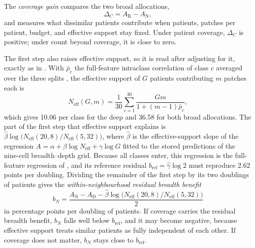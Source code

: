 \documentclass[11pt]{article}
\newcommand{\Neff}{N_{\mathrm{eff}}}
\begin{document}
The \emph{coverage gain} compares the two broad allocations,
\begin{equation}
 \Delta_C=A_{\mathrm R}-A_{\mathrm N},
 \label{eq:coverage-gain}
\end{equation}
\noindent and measures what dissimilar patients contribute when patients, patches per patient, budget, and effective support stay fixed. Under patient coverage, $\Delta_C$ is positive; under count beyond coverage, it is close to zero.

The first step also raises effective support, so it is read after adjusting for it, exactly as in \citet{queisler2026siteCoverage}. With $\bar\rho_c$ the full-feature intraclass correlation of class $c$ averaged over the three splits \citep{queisler2026multidirectionalRedundancy}, the effective support of $G$ patients contributing $m$ patches each is
\begin{equation}
 \Neff(G,m)=\frac{1}{30}\sum_{c=1}^{30}\frac{Gm}{1+(m-1)\bar\rho_c},
 \label{eq:neff}
\end{equation}
\noindent which gives 10.06 per class for the deep and 36.58 for both broad allocations. The part of the first step that effective support explains is $\hat\beta\log\bigl(\Neff(20,8)/\Neff(5,32)\bigr)$, where $\hat\beta$ is the effective-support slope of the regression $A=\alpha+\beta\log\Neff+\gamma\log G$ fitted to the stored predictions of the nine-cell breadth--depth grid. Because all classes enter, this regression is the full-feature regression of \citet{queisler2026multidirectionalRedundancy}, and its reference residual $b_{\mathrm{ref}}=\hat\gamma\log 2$ must reproduce 2.62 points per doubling. Dividing the remainder of the first step by its two doublings of patients gives the \emph{within-neighbourhood residual breadth benefit}
\begin{equation}
 b_N=\frac{A_{\mathrm N}-A_{\mathrm D}-\hat\beta\log\bigl(\Neff(20,8)/\Neff(5,32)\bigr)}{2}
 \label{eq:within-neighbourhood}
\end{equation}
\noindent in percentage points per doubling of patients. If coverage carries the residual breadth benefit, $b_N$ falls well below $b_{\mathrm{ref}}$, and it may become negative, because effective support treats similar patients as fully independent of each other. If coverage does not matter, $b_N$ stays close to $b_{\mathrm{ref}}$.
\end{document}
